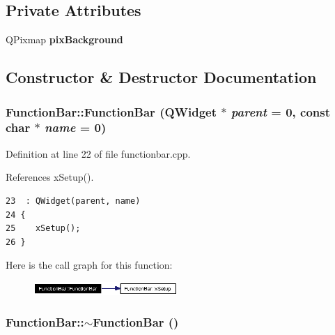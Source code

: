 \subsection*{Private Attributes}
\begin{CompactItemize}
\item 
QPixmap {\bf pix\-Background}
\end{CompactItemize}


\subsection{Constructor \& Destructor Documentation}
\subsubsection{\setlength{\rightskip}{0pt plus 5cm}Function\-Bar::Function\-Bar ({\bf QWidget} $\ast$ {\em parent} = 0, const char $\ast$ {\em name} = 0)}\label{classFunctionBar_FunctionBara0}




Definition at line 22 of file functionbar.cpp.

References x\-Setup().



\footnotesize\begin{verbatim}23  : QWidget(parent, name)
24 {
25    xSetup();
26 }
\end{verbatim}\normalsize 


Here is the call graph for this function:\begin{figure}[H]
\begin{center}
\leavevmode
\includegraphics[width=155pt]{classFunctionBar_FunctionBara0_cgraph}
\end{center}
\end{figure}
\subsubsection{\setlength{\rightskip}{0pt plus 5cm}Function\-Bar::$\sim${\bf Function\-Bar} ()}\label{classFunctionBar_FunctionBara1}




